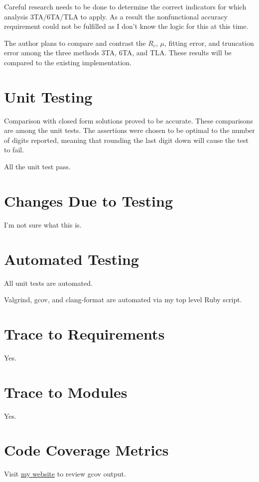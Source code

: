 \documentclass[12pt, titlepage]{article}
\begin{document}
Careful research needs to be done to determine the correct indicators for which analysis 3TA/6TA/TLA to apply.
As a result the nonfunctional accuracy requirement could not be fulfilled as I don't know the logic for
this at this time.

The author plans to compare and contrast the $R_c$, $\mu$, fitting error, and truncation error
among the three methods 3TA, 6TA, and TLA. These results will be compared to the \cite{chang1982}
existing implementation.

\section{Unit Testing}

Comparison with closed form solutions proved  to be accurate. These comparisons
are among the unit tests. The assertions were chosen to be optimal to the number of digits
reported, meaning that rounding the last digit down will cause the test to fail.

All the unit test pass.

\section{Changes Due to Testing}

I'm not sure what this is.

\section{Automated Testing}

All unit tests are automated.

Valgrind, gcov, and clang-format are automated via my top level Ruby script.
		
\section{Trace to Requirements}

Yes.
		
\section{Trace to Modules}		

Yes.

\section{Code Coverage Metrics}

Visit \href{http://www.johnernsthausen.com/experiences/coverage/}{my website} to review gcov output.




\end{document}
